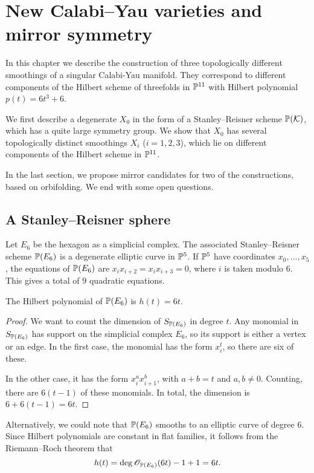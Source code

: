 \chapter{New Calabi--Yau varieties and mirror symmetry}
\label{sec:constructions}

In this chapter we describe the construction of three topologically different smoothings of a singular Calabi-Yau manifold. They correspond to different components of the Hilbert scheme of threefolds in $\P^{11}$ with Hilbert polynomial $p(t)=6t^3+6$. 

We first describe a degenerate \CY $X_0$ in the form of a Stanley--Reisner scheme $\P(\K)$, which has a quite large symmetry group. We show that $X_0$ has several topologically distinct smoothings $X_i$ (${i=1,2,3}$), which lie on different components of the Hilbert scheme in $\P^{11}$.

In the last section, we propose mirror candidates for two of the constructions, based on orbifolding. We end with some open questions.

\section{A Stanley--Reisner sphere}

Let $E_6$ be the hexagon as a simplicial complex. The associated Stanley--Reisner scheme $\P(E_6)$ is a degenerate elliptic curve in $\P^5$. If $\P^5$ have coordinates $x_0,\ldots,x_5$, the equations of $\P(E_6)$ are $x_ix_{i+2}=x_ix_{i+3}=0$, where $i$ is taken modulo $6$. This gives a total of $9$ quadratic equations.

\begin{lemma}
\label{lemma:hilbpoly}
The Hilbert polynomial of $\P(E_6)$ is $h(t)=6t$.
\end{lemma}
\begin{proof}
We want to count the dimension of $S_{\P(E_6)}$ in degree $t$. Any monomial in $S_{\P(E_6)}$ has support on the simplicial complex $E_6$, so its support is either a vertex or an edge. In the first case, the monomial has the form $x_i^t$, so there are six of these.

In the other case, it has the form $x_i^ax_{i+1}^b$, with $a+b=t$ and $a,b \neq 0$. Counting, there are $6(t-1)$ of these monomials. In total, the dimension is $6+6(t-1)=6t$.
\end{proof}
\begin{remark}
Alternatively, we could note that $\P(E_6)$ smooths to an elliptic curve of degree $6$. Since Hilbert polynomials are constant in flat families, it follows from the Riemann--Roch theorem that \[h(t)=\deg \OO_{\P(E_6)}(6t)-1+1=6t.\]
\end{remark}

